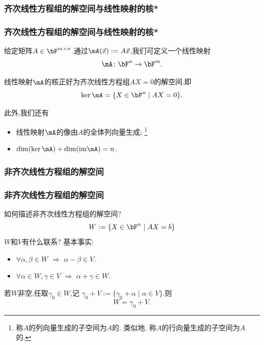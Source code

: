 \renewcommand{\mydate}{2025年04月17号\ 第十六次课}


\subsubsection{齐次线性方程组的解空间与线性映射的核*}
\begin{frame}\frametitle{齐次线性方程组的解空间与线性映射的核*}
\pp
给定矩阵$A\in\bF^{m\times n}$.\pp 通过$\mA(\vec{x}):=A\vec{x}$,我们可定义一个线性映射
\[\mA\colon \bF^n \rightarrow \bF^m.\]
\pp
\begin{proposition}
线性映射$\mA$的核正好为齐次线性方程组$AX=0$的解空间.\pp 即
\[\ker\mA = \{X\in \bF^n \mid AX=0\}.\]
\end{proposition}
\pp
此外,我们还有
\begin{proposition}
\begin{itemize}
\item 线性映射$\mA$的像由$A$的全体列向量生成;
\footnote{称$A$的列向量生成的子空间为$A$的.
类似地, 称$A$的行向量生成的子空间为$A$的.}
\pp
\item $\dim(\ker\mA) + \dim(\mathrm{im}\mA) = n$.
\end{itemize}
\end{proposition}
\end{frame}





\subsubsection{非齐次线性方程组的解空间}
\begin{frame}\frametitle{非齐次线性方程组的解空间}
如何描述非齐次线性方程组的解空间?
\pp
\[W:=\{X\in \bF^n\mid AX=b\}\]
$W$和$V$有什么联系?
\pp
基本事实:
\begin{itemize}
\item $\forall \alpha,\beta \in W$ $\Rightarrow$ $\alpha-\beta\in V$.\pp
\item $\forall \alpha\in W,\gamma\in V$ $\Rightarrow$ $\alpha+\gamma\in W$.
\end{itemize}
\pp
\begin{theorem}
若$W$非空,任取$\gamma_0\in W$,记 $\gamma_0+V:=\{\gamma_0+\alpha\mid \alpha \in V\}$.\pp 则
\[W=\gamma_0+V.\]
\end{theorem}
\pp
{}
\end{frame}






